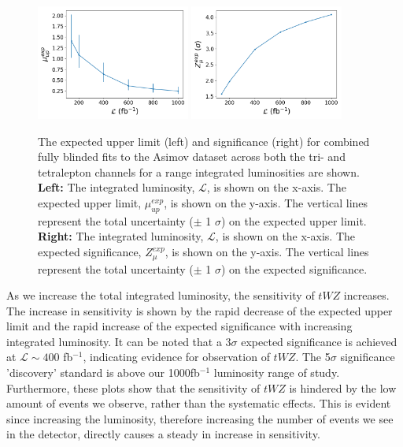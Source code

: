 \begin{figure}[h!]
    \centering
    \includegraphics[width=0.45\textwidth]{figures/combined/exp_upper.png}
    \includegraphics[width=0.45\textwidth]{figures/combined/signif.png}
    \caption{The expected upper limit (left) and significance (right) for combined fully blinded fits to the Asimov dataset across both the tri- and tetralepton channels for a range integrated luminosities are shown. \textbf{Left: }The integrated luminosity, $\mathcal{L}$, is shown on the x-axis. The expected upper limit, $\mu_{up}^{exp}$, is shown on the y-axis. The vertical lines represent the total uncertainty ($\pm$ 1 $\sigma$) on the expected upper limit. \textbf{Right: }The integrated luminosity, $\mathcal{L}$, is shown on the x-axis. The expected significance, $Z_{\mu}^{exp}$, is shown on the y-axis. The vertical lines represent the total uncertainty ($\pm$ 1 $\sigma$) on the expected significance.}
    \label{fig:limit-sig-projection}
\end{figure}

As we increase the total integrated luminosity, the sensitivity of $tWZ$ increases. The increase in sensitivity is shown by the rapid decrease of the expected upper limit and the rapid increase of the expected significance with increasing integrated luminosity. It can be noted that a 3$\sigma$ expected significance is achieved at $\mathcal{L} \sim 400$ fb$^{-1}$, indicating evidence for observation of $tWZ$. The 5$\sigma$ significance 'discovery' standard is above our 1000fb$^{-1}$ luminosity range of study. Furthermore, these plots show that the sensitivity of $tWZ$ is hindered by the low amount of events we observe, rather than the systematic effects. This is evident since increasing the luminosity, therefore increasing the number of events we see in the detector, directly causes a steady in increase in sensitivity.

